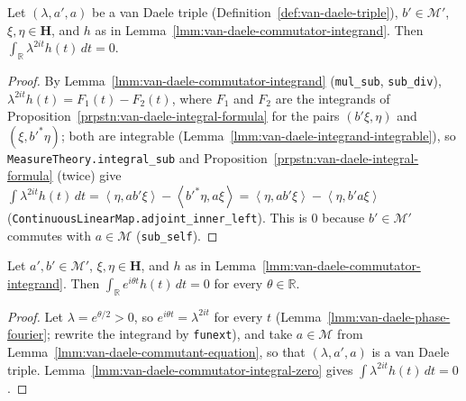 \begin{lemma}
    \label{lmm:van-daele-commutator-integral-zero}
    \leanok
    Let $(\lambda, a', a)$ be a van Daele triple (Definition~\ref{def:van-daele-triple}), $b' \in \mathcal{M}'$, $\xi, \eta \in \mathbf{H}$, and $h$ as in Lemma~\ref{lmm:van-daele-commutator-integrand}. Then $\int_{\mathbb{R}} \lambda^{2it}h(t) \, dt = 0$.
\end{lemma}
\begin{proof}
    \leanok
    By Lemma~\ref{lmm:van-daele-commutator-integrand} (\texttt{mul\_sub}, \texttt{sub\_div}), $\lambda^{2it}h(t) = F_1(t) - F_2(t)$, where $F_1$ and $F_2$ are the integrands of Proposition~\ref{prpstn:van-daele-integral-formula} for the pairs $(b'\xi, \eta)$ and $(\xi, b'^*\eta)$; both are integrable (Lemma~\ref{lmm:van-daele-integrand-integrable}), so \texttt{MeasureTheory.integral\_sub} and Proposition~\ref{prpstn:van-daele-integral-formula} (twice) give $\int \lambda^{2it}h(t) \, dt = \left< \eta, ab'\xi \right> - \left< b'^*\eta, a\xi \right> = \left< \eta, ab'\xi \right> - \left< \eta, b'a\xi \right>$ (\texttt{ContinuousLinearMap.adjoint\_inner\_left}). This is $0$ because $b' \in \mathcal{M}'$ commutes with $a \in \mathcal{M}$ (\texttt{sub\_self}).
\end{proof}

\begin{lemma}
    \label{lmm:van-daele-commutator-fourier}
    \leanok
    Let $a', b' \in \mathcal{M}'$, $\xi, \eta \in \mathbf{H}$, and $h$ as in Lemma~\ref{lmm:van-daele-commutator-integrand}. Then $\int_{\mathbb{R}} e^{i\theta t}h(t) \, dt = 0$ for every $\theta \in \mathbb{R}$.
\end{lemma}
\begin{proof}
    \leanok
    Let $\lambda = e^{\theta/2} > 0$, so $e^{i\theta t} = \lambda^{2it}$ for every $t$ (Lemma~\ref{lmm:van-daele-phase-fourier}; rewrite the integrand by \texttt{funext}), and take $a \in \mathcal{M}$ from Lemma~\ref{lmm:van-daele-commutant-equation}, so that $(\lambda, a', a)$ is a van Daele triple. Lemma~\ref{lmm:van-daele-commutator-integral-zero} gives $\int \lambda^{2it}h(t) \, dt = 0$.
\end{proof}

